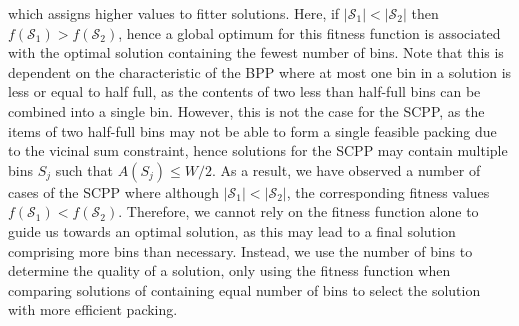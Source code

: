\documentclass[authoryear]{elsarticle}
\begin{document}
\noindent which assigns higher values to fitter solutions. Here, if $|\mathcal{S}_1| < |\mathcal{S}_2|$  then $f(\mathcal{S}_1) > f(\mathcal{S}_2)$, hence a global optimum for this fitness function is associated with the optimal solution containing the fewest number of bins. Note that this is dependent on the characteristic of the BPP where at most one bin in a solution is less or equal to half full, as the contents of two less than half-full bins can be combined into a single bin. However, this is not the case for the SCPP, as the items of two half-full bins may not be able to form a single feasible packing due to the vicinal sum constraint, hence solutions for the SCPP may contain multiple bins $S_j$ such that $A(S_j) \leq W/2$. As a result, we have observed a number of cases of the SCPP where although  $|\mathcal{S}_1| < |\mathcal{S}_2|$, the corresponding fitness values $f(\mathcal{S}_1) < f(\mathcal{S}_2)$. Therefore, we cannot rely on the fitness function alone to guide us towards an optimal solution, as this may lead to a final solution comprising more bins than necessary. Instead, we use the number of bins to determine the quality of a solution, only using the fitness function when comparing solutions of containing equal number of bins to select the solution with more efficient packing.
\end{document}
